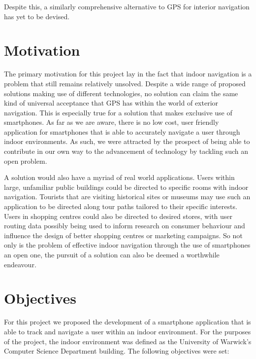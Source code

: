 \documentclass[12pt,a4paper]{report}
\begin{document}
Despite this, a similarly comprehensive alternative to GPS for interior navigation has yet to be devised.

\section{Motivation}

The primary motivation for this project lay in the fact that indoor navigation is a problem that still remains relatively unsolved. Despite a wide range of proposed solutions making use of different technologies, no solution can claim the same kind of universal acceptance that GPS has within the world of exterior navigation. This is especially true for a solution that makes exclusive use of smartphones. As far as we are aware, there is no low cost, user friendly application for smartphones that is able to accurately navigate a user through indoor environments. As such, we were attracted by the prospect of being able to contribute in our own way to the advancement of technology by tackling such an open problem.

A solution would also have a myriad of real world applications. Users within large, unfamiliar public buildings could be directed to specific rooms with indoor navigation. Tourists that are visiting historical sites or museums may use such an application to be directed along tour paths tailored to their specific interests. Users in shopping centres could also be directed to desired stores, with user routing data possibly being used to inform research on consumer behaviour and influence the design of better shopping centres or marketing campaigns. So not only is the problem of effective indoor navigation through the use of smartphones an open one, the pursuit of a solution can also be deemed a worthwhile endeavour.

\section{Objectives}

For this project we proposed the development of a smartphone application that is able to track and navigate a user within an indoor environment. For the purposes of the project, the indoor environment was defined as the University of Warwick's Computer Science Department building. The following objectives were set:
\end{document}

